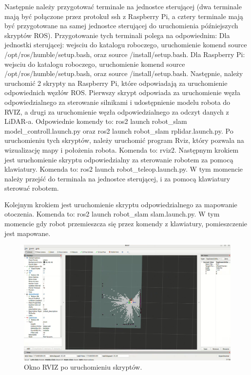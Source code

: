 \documentclass[a4paper,twoside,12pt]{book}
\begin{document}
Następnie należy przygotować terminale na jednostce sterującej (dwa terminale mają być połączone przez protokuł ssh z Raspberry Pi, a cztery terminale mają być przygotowane na samej jednostce sterującej do uruchomienia późniejszych skryptów ROS). Przygotowanie tych terminali polega na odpowiednim:
\newline
Dla jednostki sterującej: wejsciu do katalogu roboczego, uruchomienie komend source /opt/ros/humble/setup.bash, oraz source /install/setup.bash.
\newline\newline
Dla Raspberry Pi: wejsciu do katalogu roboczego, uruchomienie komend source /opt/ros/humble/setup.bash, oraz source /install/setup.bash.
\newline\newline
Następnie, należy uruchomić 2 skrypty na Raspberry Pi, które odpowiadają za uruchomienie odpowiednich węzłów ROS. Pierwszy skrypt odpowiada za uruchomienie węzła odpowiedzialnego za sterowanie silnikami i udostępnienie modelu robota do RVIZ, a drugi za uruchomienie węzła odpowiedzialnego za odczyt danych z LiDAR-a. Odpowiednie komendy to: ros2 launch robot\_slam model\_controll.launch.py oraz ros2 launch robot\_slam rplidar.launch.py.
\newline\newline
\newpage
Po uruchomieniu tych skryptów, należy uruchomić program Rviz, który pozwala na wizualizację mapy i położenia robota. Komenda to: rviz2. Następnym krokiem jest uruchomienie skryptu odpowiedzialny za sterowanie robotem za pomocą klawiatury. Komenda to: ros2 launch robot\_teleop.launch.py. W tym momencie należy przejść do terminala na jednostce sterującej, i za pomocą klawiatury sterować robotem. 
\newline

Kolejnym krokiem jest uruchomienie skryptu odpowiedzialnego za mapowanie otoczenia. Komenda to: ros2 launch robot\_slam slam.launch.py. W tym momencie gdy robot przemieszcza się przez komendy z klawiatury, pomieszczenie jest mapowane.

\begin{figure}[!hb]
	\centering
	\includegraphics[width=1\textwidth]{images/launch-map.png}
	\caption{Okno RVIZ po uruchomieniu skryptów.}
	\label{fig:launch-map}
\end{figure}
\end{document}
